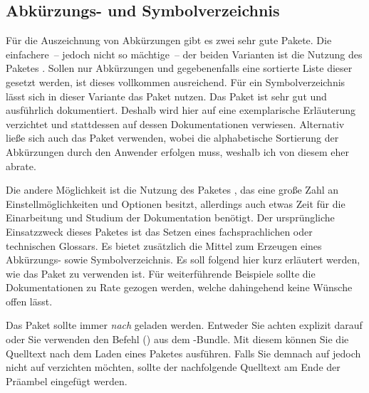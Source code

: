 \documentclass[%
  english,ngerman,%
  cdgeometry=no,DIV=12,%
  automark,%
  listof=toc,%
]{tudscrartcl}
\begin{document}
\subsection{Abkürzungs- und Symbolverzeichnis}
\label{sec:glossaries}%
%
Für die Auszeichnung von Abkürzungen gibt es zwei sehr gute Pakete. Die 
einfachere~-- jedoch nicht so mächtige~-- der beiden Varianten ist die Nutzung 
des Paketes . Sollen nur Abkürzungen und gegebenenfalls eine 
sortierte Liste dieser gesetzt werden, ist dieses vollkommen ausreichend. Für 
ein Symbolverzeichnis lässt sich in dieser Variante das Paket  
nutzen. Das Paket  ist sehr gut und ausführlich dokumentiert. 
Deshalb wird hier auf eine exemplarische Erläuterung verzichtet und stattdessen 
auf dessen Dokumentationen verwiesen. Alternativ ließe sich auch das Paket 
 verwenden, wobei die alphabetische Sortierung der Abkürzungen 
durch den Anwender erfolgen muss, weshalb ich von diesem eher abrate.

Die andere Möglichkeit ist die Nutzung des Paketes , das 
eine große Zahl an Einstellmöglichkeiten und Optionen besitzt, allerdings auch 
etwas Zeit für die Einarbeitung und Studium der Dokumentation benötigt. Der 
ursprüngliche Einsatzzweck dieses Paketes ist das Setzen eines fachsprachlichen 
oder technischen Glossars. Es bietet zusätzlich die Mittel zum Erzeugen eines 
Abkürzungs- sowie Symbolverzeichnis. Es soll folgend hier kurz erläutert 
werden, wie das Paket zu verwenden ist. Für weiterführende Beispiele sollte 
die Dokumentationen zu Rate gezogen werden, welche dahingehend keine Wünsche 
offen lässt. 

Das Paket  sollte immer \emph{nach}  
geladen werden. Entweder Sie achten explizit darauf oder Sie verwenden den 
Befehl () aus dem \KOMAScript-Bundle. Mit 
diesem können Sie die Quelltext nach dem Laden eines Paketes ausführen. 
Falls Sie demnach auf  jedoch nicht auf  
verzichten möchten, sollte der nachfolgende Quelltext am Ende der Präambel 
eingefügt werden.
\end{document}
